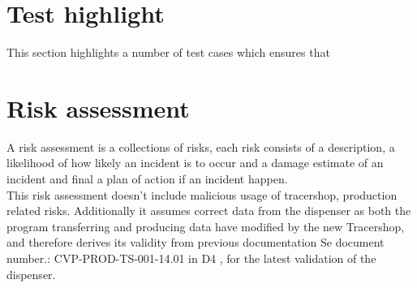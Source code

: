 \documentclass{article}
\begin{document}
\section*{Test highlight}
This section highlights a number of test cases which ensures that



\section*{Risk assessment}
A risk assessment is a collections of risks, each risk consists of a description, a likelihood of how likely an incident is to occur and a damage estimate of an incident
and final a plan of action if an incident happen. \\
This risk assessment doesn't include malicious usage of tracershop, production related risks.
Additionally it assumes correct data from the dispenser as both the program transferring and producing data have modified by the new Tracershop,
and therefore derives its validity from previous documentation Se document number.: CVP-PROD-TS-001-14.01 in D4 ,
for the latest validation of the dispenser.
\end{document}
